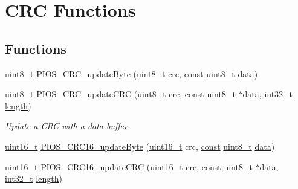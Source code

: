 \hypertarget{group___p_i_o_s___c_r_c}{\section{C\-R\-C Functions}
\label{group___p_i_o_s___c_r_c}
}
\subsection*{Functions}
\begin{DoxyCompactItemize}
\item 
\hyperlink{stdint_8h_aba7bc1797add20fe3efdf37ced1182c5}{uint8\-\_\-t} \hyperlink{group___p_i_o_s___c_r_c_ga7a3781ede0c0bbd4c15f6513597e09f8}{P\-I\-O\-S\-\_\-\-C\-R\-C\-\_\-update\-Byte} (\hyperlink{stdint_8h_aba7bc1797add20fe3efdf37ced1182c5}{uint8\-\_\-t} crc, \hyperlink{group___n_a_m_e_ga7ae6d0e43244213b34de2c2b9aa30da6}{const} \hyperlink{stdint_8h_aba7bc1797add20fe3efdf37ced1182c5}{uint8\-\_\-t} \hyperlink{pios__opahrs__proto_8h_a20e3f4bfaeccf09a75ef27e095a10112}{data})
\item 
\hyperlink{stdint_8h_aba7bc1797add20fe3efdf37ced1182c5}{uint8\-\_\-t} \hyperlink{group___p_i_o_s___c_r_c_ga76c5afc1db85ddf9511c4d993714d094}{P\-I\-O\-S\-\_\-\-C\-R\-C\-\_\-update\-C\-R\-C} (\hyperlink{stdint_8h_aba7bc1797add20fe3efdf37ced1182c5}{uint8\-\_\-t} crc, \hyperlink{group___n_a_m_e_ga7ae6d0e43244213b34de2c2b9aa30da6}{const} \hyperlink{stdint_8h_aba7bc1797add20fe3efdf37ced1182c5}{uint8\-\_\-t} $\ast$\hyperlink{pios__opahrs__proto_8h_a20e3f4bfaeccf09a75ef27e095a10112}{data}, \hyperlink{group___n_a_m_e_gafd12020da5a235dfcf0c3c748fb5baed}{int32\-\_\-t} \hyperlink{mavlink__helpers_8h_a4254bfa282bd215965d99b8d6b527a04}{length})
\begin{DoxyCompactList}\small\item\em Update a C\-R\-C with a data buffer. \end{DoxyCompactList}\item 
\hyperlink{stdint_8h_a273cf69d639a59973b6019625df33e30}{uint16\-\_\-t} \hyperlink{group___p_i_o_s___c_r_c_gaa0719ccb53a4a29e7123ff950364e2b5}{P\-I\-O\-S\-\_\-\-C\-R\-C16\-\_\-update\-Byte} (\hyperlink{stdint_8h_a273cf69d639a59973b6019625df33e30}{uint16\-\_\-t} crc, \hyperlink{group___n_a_m_e_ga7ae6d0e43244213b34de2c2b9aa30da6}{const} \hyperlink{stdint_8h_aba7bc1797add20fe3efdf37ced1182c5}{uint8\-\_\-t} \hyperlink{pios__opahrs__proto_8h_a20e3f4bfaeccf09a75ef27e095a10112}{data})
\item 
\hyperlink{stdint_8h_a273cf69d639a59973b6019625df33e30}{uint16\-\_\-t} \hyperlink{group___p_i_o_s___c_r_c_ga26ddbe84d2b3c7c295d740bed0a7bc08}{P\-I\-O\-S\-\_\-\-C\-R\-C16\-\_\-update\-C\-R\-C} (\hyperlink{stdint_8h_a273cf69d639a59973b6019625df33e30}{uint16\-\_\-t} crc, \hyperlink{group___n_a_m_e_ga7ae6d0e43244213b34de2c2b9aa30da6}{const} \hyperlink{stdint_8h_aba7bc1797add20fe3efdf37ced1182c5}{uint8\-\_\-t} $\ast$\hyperlink{pios__opahrs__proto_8h_a20e3f4bfaeccf09a75ef27e095a10112}{data}, \hyperlink{group___n_a_m_e_gafd12020da5a235dfcf0c3c748fb5baed}{int32\-\_\-t} \hyperlink{mavlink__helpers_8h_a4254bfa282bd215965d99b8d6b527a04}{length})

\end{DoxyCompactItemize}
